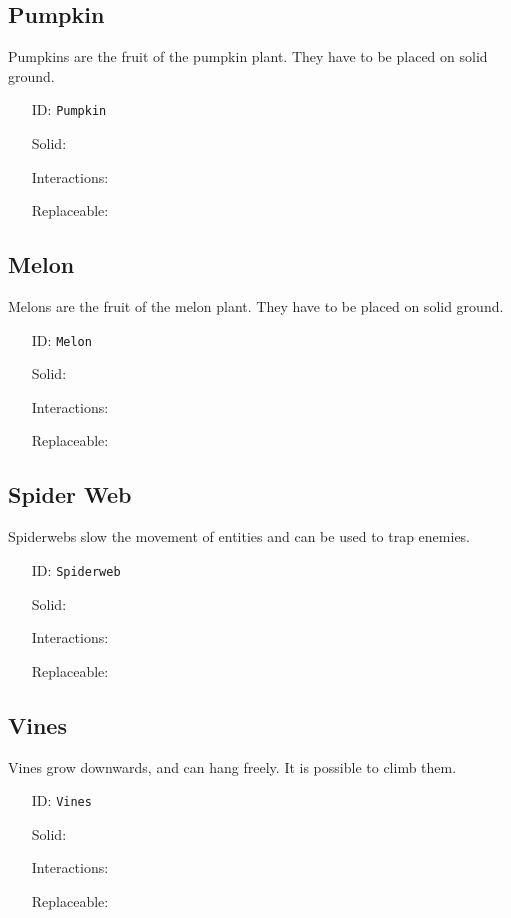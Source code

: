 \subsection{Pumpkin}\label{subsec:blocks_pumpkin}
Pumpkins are the fruit of the pumpkin plant. They have to be placed on solid ground.
\newline
\begin{itemize}[nosep]
    \item[ID:] \texttt{Pumpkin}
    \item[Solid:]  \Checkmark \item[Interactions:]  \XSolidBrush \item[Replaceable:]  \XSolidBrush
\end{itemize}

\subsection{Melon}\label{subsec:blocks_melon}
Melons are the fruit of the melon plant. They have to be placed on solid ground.
\newline
\begin{itemize}[nosep]
    \item[ID:] \texttt{Melon}
    \item[Solid:]  \Checkmark \item[Interactions:]  \XSolidBrush \item[Replaceable:]  \XSolidBrush
\end{itemize}

\subsection{Spider Web}\label{subsec:blocks_spider web}
Spiderwebs slow the movement of entities and can be used to trap enemies.
\newline
\begin{itemize}[nosep]
    \item[ID:] \texttt{Spiderweb}
    \item[Solid:]  \XSolidBrush \item[Interactions:]  \XSolidBrush \item[Replaceable:]  \XSolidBrush
\end{itemize}

\subsection{Vines}\label{subsec:blocks_vines}
Vines grow downwards, and can hang freely. It is possible to climb them.
\newline
\begin{itemize}[nosep]
    \item[ID:] \texttt{Vines}
    \item[Solid:]  \XSolidBrush \item[Interactions:]  \XSolidBrush \item[Replaceable:]  \XSolidBrush
\end{itemize}

